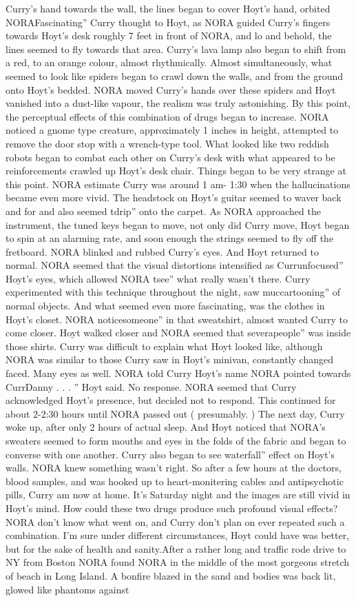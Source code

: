 \documentclass[12pt]{book}
\begin{document}
Curry's hand towards the wall, the lines began to cover Hoyt's hand, orbited NORAFascinating'' Curry thought to Hoyt, as NORA guided Curry's fingers towards Hoyt's desk roughly 7 feet in front of NORA, and lo and behold, the lines seemed to fly towards that area. Curry's lava lamp also began to shift from a red, to an orange colour, almost rhythmically. Almost simultaneously, what seemed to look like spiders began to crawl down the walls, and from the ground onto Hoyt's bedded. NORA moved Curry's hands over these spiders and Hoyt vanished into a dust-like vapour, the realism was truly astonishing. By this point, the perceptual effects of this combination of drugs began to increase. NORA noticed a gnome type creature, approximately 1  inches in height, attempted to remove the door stop with a wrench-type tool. What looked like two reddish robots began to combat each other on Curry's desk with what appeared to be reinforcements crawled up Hoyt's desk chair. Things began to be very strange at this point. NORA estimate Curry was around 1 am- 1:30 when the hallucinations became even more vivid. The headstock on Hoyt's guitar seemed to waver back and for and also seemed tdrip'' onto the carpet. As NORA approached the instrument, the tuned keys began to move, not only did Curry move, Hoyt began to spin at an alarming rate, and soon enough the strings seemed to fly off the fretboard. NORA blinked and rubbed Curry's eyes. And Hoyt returned to normal. NORA seemed that the visual distortions intensified as Currunfocused'' Hoyt's eyes, which allowed NORA tsee'' what really wasn't there. Curry experimented with this technique throughout the night, saw muccartooning'' of normal objects. And what seemed even more fascinating, was the clothes in Hoyt's closet. NORA noticesomeone'' in that sweatshirt, almost wanted Curry to come closer. Hoyt walked closer and NORA seemed that severapeople'' was inside those shirts. Curry was difficult to explain what Hoyt looked like, although NORA was similar to those Curry saw in Hoyt's minivan, constantly changed faced. Many eyes as well. NORA told Curry Hoyt's name NORA pointed towards CurrDanny . . . '' Hoyt said. No response. NORA seemed that Curry acknowledged Hoyt's presence, but decided not to respond. This continued for about 2-2:30 hours until NORA passed out ( presumably. ) The next day, Curry woke up, after only 2 hours of actual sleep. And Hoyt noticed that NORA's sweaters seemed to form mouths and eyes in the folds of the fabric and began to converse with one another. Curry also began to see waterfall'' effect on Hoyt's walls. NORA knew something wasn't right. So after a few hours at the doctors, blood samples, and was hooked up to heart-monitering cables and antipsychotic pills, Curry am now at home. It's Saturday night and the images are still vivid in Hoyt's mind. How could these two drugs produce such profound visual effects? NORA don't know what went on, and Curry don't plan on ever repeated such a combination. I'm sure under different circumstances, Hoyt could have was better, but for the sake of health and sanity.After a rather long and traffic rode drive to NY from Boston NORA found NORA in the middle of the most gorgeous stretch of beach in Long Island. A bonfire blazed in the sand and bodies was back lit, glowed like phantoms against 
\end{document}
